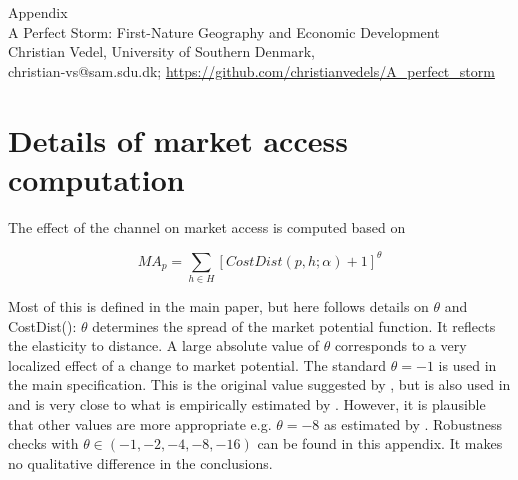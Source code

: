 \setcounter{table}{0}
\setcounter{figure}{0}
\setcounter{section}{0}
\renewcommand*{\thesection}{\Alph{section}}
\renewcommand{\thefigure}{A\arabic{figure}}
\renewcommand{\thetable}{A\arabic{table}}


\begin{title}

    \begin{center}
        
        \Huge
        Appendix \\
        \LARGE
        A Perfect Storm: First-Nature Geography and Economic Development \\
        
        \vspace{0.5cm}
        \large
        Christian Vedel, University of Southern Denmark,\\
        \small
        \vspace{0.25cm}
        christian-vs@sam.sdu.dk; 
        \url{https://github.com/christianvedels/A_perfect_storm}
        
    \end{center}

    \localtableofcontents %
        
    \vfill
    
\end{title}


\section{Details of market access computation}

The effect of the channel on market access is computed based on 

\begin{equation}
\label{eq:MA2_a}
{MA}_p = \sum_{h \in H} [CostDist(p, h; \alpha) + 1]^\theta
\end{equation}

Most of this is defined in the main paper, but here follows details on $\theta$ and CostDist(): $\theta$ determines the spread of the market potential function. It reflects the elasticity to distance. A large absolute value of $\theta$ corresponds to a very localized effect of a change to market potential. The standard $\theta = -1$ is used in the main specification.  This is the original value suggested by \cite{Harris1954}, but is also used in \cite{rauch2022a} and is very close to what is empirically estimated by \cite{Redding2008}. However, it is plausible that other values are more appropriate e.g. $\theta = -8$ as estimated by \cite{Donaldson2016}. Robustness checks with $\theta \in (-1, -2, -4, -8, -16)$ can be found in this appendix. It makes no qualitative difference in the conclusions.  

